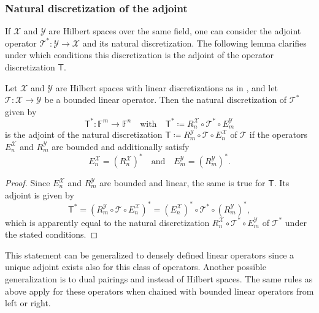 \documentclass[a4paper]{paper}
\newcommand*{\SPC}[1]{{\ensuremath{\mathscr{#1}}}}
\newcommand*{\SPCX}{\SPC{X}}
\newcommand*{\SPCY}{\SPC{Y}}
\newcommand*{\FIELD}{{\ensuremath{\mathbb{F}}}}
\newcommand*{\Fn}{{\ensuremath{\FIELD^n}}}
\newcommand*{\Fm}{{\ensuremath{\FIELD^m}}}
\newcommand*{\OP}[1]{{\ensuremath{\mathcal{#1}}}}
\newcommand*{\OPT}{\OP{T}}
\newcommand{\DISCOP}[1]{{\ensuremath{\mathsf{#1}}}}
\newcommand*{\DISCOPT}{\DISCOP{T}}
\newcommand*{\EXT}[2]{\ensuremath{E_{#1}^{#2}}}
\newcommand*{\REST}[2]{\ensuremath{R_{#1}^{#2}}}
\newcommand*{\RnX}{{\ensuremath{\REST{n}{\SPC{X}}}}}
\newcommand*{\RmY}{{\ensuremath{\REST{m}{\SPC{Y}}}}}
\newcommand*{\EnX}{{\ensuremath{\EXT{n}{\SPC{X}}}}}
\newcommand*{\EmY}{{\ensuremath{\EXT{m}{\SPC{Y}}}}}
\DeclareMathOperator{\DEFEQ}{{\coloneqq}}
\begin{document}
\subsubsection{Natural discretization of the adjoint}
\label{subsubsec:discr:operator:op_adj}

If $\SPCX$ and $\SPCY$ are Hilbert spaces over the same field, one can consider the adjoint operator 
$\OPT^* \colon \SPCY \to \SPCX$ and its natural discretization. The following lemma clarifies under which 
conditions this discretization is the adjoint of the operator discretization $\DISCOPT$.


\begin{lemma}
 \label{lemma:discr:operator:op_adj:natural_is_adj}
 Let $\SPCX$ and $\SPCY$ are Hilbert spaces with linear discretizations as in 
 , and let $\OPT \colon \SPCX \to \SPCY$ be a bounded linear operator. 
 Then the natural discretization of $\OPT^*$ given by
 \begin{equation*}
  \DISCOPT^* \colon \Fm \to \Fn
  \quad \text{with} \quad
  \DISCOPT^* \DEFEQ  \RnX \circ \OPT^* \circ \EmY
 \end{equation*}
 is the adjoint of the natural discretization $\DISCOPT \DEFEQ  \RmY \circ \OPT \circ \EnX$ of $\OPT$ if the 
operators 
 $\EnX$ and $\RmY$ are bounded and additionally satisfy
 \begin{equation*}
  \EnX = (\RnX)^* \quad \text{and} \quad \EmY = (\RmY)^*.
 \end{equation*}
\end{lemma}
\vspace{1em}


\begin{proof}
 Since $\EnX$ and $\RmY$ are bounded and linear, the same is true for $\DISCOPT$. Its adjoint is given by
 \begin{equation*}
  \DISCOPT^* = (\RmY \circ \OPT \circ \EnX)^* = (\EnX)^* \circ \OPT^* \circ (\RmY)^*,
 \end{equation*}
 which is apparently equal to the natural discretization $\RnX \circ \OPT^* \circ \EmY$ of $\OPT^*$ under the 
 stated conditions.
\end{proof}

\begin{remark}
 This statement can be generalized to densely defined linear operators since a unique adjoint exists also for this 
 class of operators. Another possible generalization is to dual pairings and instead of Hilbert spaces. The same rules 
 as above apply for these operators when chained with bounded linear operators from left or right.
\end{remark}
\end{document}
